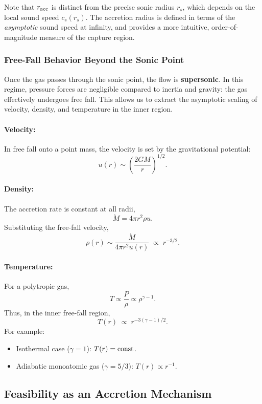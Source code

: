 \begin{remark}
Note that $r_{\rm acc}$ is distinct from the precise sonic radius $r_s$, which depends
on the local sound speed $c_s(r_s)$. The accretion radius is defined in terms of the
\emph{asymptotic} sound speed at infinity, and provides a more intuitive, order-of-magnitude
measure of the capture region.
\end{remark}

\subsubsection{Free-Fall Behavior Beyond the Sonic Point}

Once the gas passes through the sonic point, the flow is \textbf{supersonic}. In this
regime, pressure forces are negligible compared to inertia and gravity: the gas
effectively undergoes free fall. This allows us to extract the asymptotic scaling of
velocity, density, and temperature in the inner region.

\paragraph{Velocity:} In free fall onto a point mass, the velocity is set by the
gravitational potential:
\[
u(r) \sim \left(\frac{2GM}{r}\right)^{1/2}.
\]

\paragraph{Density:} The accretion rate is constant at all radii,
\[
\dot{M} = 4\pi r^2 \rho u.
\]
Substituting the free-fall velocity,
\[
\rho(r) \sim \frac{\dot{M}}{4\pi r^2 u(r)} \;\propto\; r^{-3/2}.
\]

\paragraph{Temperature:} For a polytropic gas,
\[
T \propto \frac{P}{\rho} \propto \rho^{\gamma-1}.
\]
Thus, in the inner free-fall region,
\[
T(r) \;\propto\; r^{-3(\gamma-1)/2}.
\]
For example:
\begin{itemize}
    \item Isothermal case ($\gamma=1$): $T(r) = \rm{const}$.  
    \item Adiabatic monoatomic gas ($\gamma=5/3$): $T(r) \propto r^{-1}$.
\end{itemize}

\subsection{Feasibility as an Accretion Mechanism}

